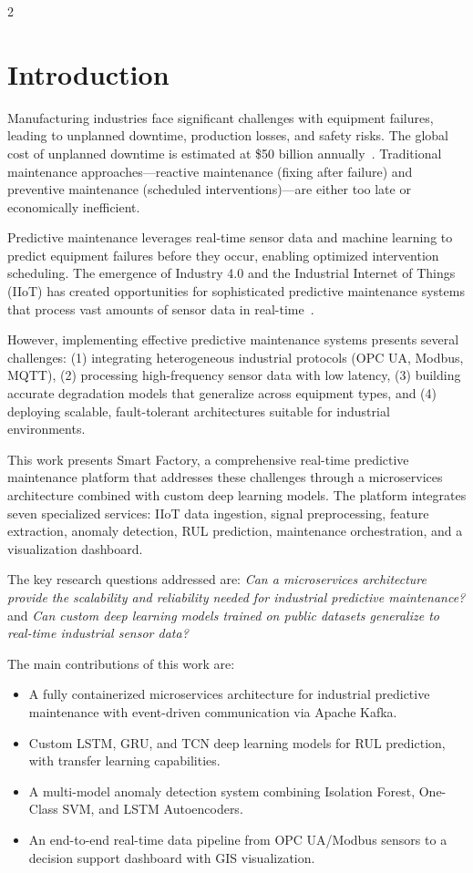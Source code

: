 \documentclass{ijceds} %
\begin{document}
\begin{multicols}{2}

\section{Introduction}

Manufacturing industries face significant challenges with equipment failures, leading to unplanned downtime, production losses, and safety risks. The global cost of unplanned downtime is estimated at \$50 billion annually~\cite{deloitte2017predictive}. Traditional maintenance approaches—reactive maintenance (fixing after failure) and preventive maintenance (scheduled interventions)—are either too late or economically inefficient.

Predictive maintenance leverages real-time sensor data and machine learning to predict equipment failures before they occur, enabling optimized intervention scheduling. The emergence of Industry 4.0 and the Industrial Internet of Things (IIoT) has created opportunities for sophisticated predictive maintenance systems that process vast amounts of sensor data in real-time~\cite{susto2015survey}.

However, implementing effective predictive maintenance systems presents several challenges: (1) integrating heterogeneous industrial protocols (OPC UA, Modbus, MQTT), (2) processing high-frequency sensor data with low latency, (3) building accurate degradation models that generalize across equipment types, and (4) deploying scalable, fault-tolerant architectures suitable for industrial environments.

This work presents Smart Factory, a comprehensive real-time predictive maintenance platform that addresses these challenges through a microservices architecture combined with custom deep learning models. The platform integrates seven specialized services: IIoT data ingestion, signal preprocessing, feature extraction, anomaly detection, RUL prediction, maintenance orchestration, and a visualization dashboard.

The key research questions addressed are: \textit{Can a microservices architecture provide the scalability and reliability needed for industrial predictive maintenance?} and \textit{Can custom deep learning models trained on public datasets generalize to real-time industrial sensor data?}

The main contributions of this work are:
\begin{itemize}
    \item A fully containerized microservices architecture for industrial predictive maintenance with event-driven communication via Apache Kafka.
    \item Custom LSTM, GRU, and TCN deep learning models for RUL prediction, with transfer learning capabilities.
    \item A multi-model anomaly detection system combining Isolation Forest, One-Class SVM, and LSTM Autoencoders.
    \item An end-to-end real-time data pipeline from OPC UA/Modbus sensors to a decision support dashboard with GIS visualization.
\end{itemize}


\end{multicols}
\end{document}

